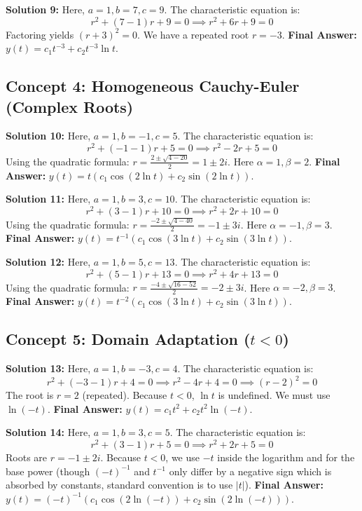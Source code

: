 \documentclass[11pt]{article}
\begin{document}
\textbf{Solution 9:}
Here, $a=1, b=7, c=9$. The characteristic equation is:
\[ r^2 + (7 - 1)r + 9 = 0 \implies r^2 + 6r + 9 = 0 \]
Factoring yields $(r + 3)^2 = 0$. We have a repeated root $r = -3$.
\textbf{Final Answer:} $y(t) = c_1 t^{-3} + c_2 t^{-3} \ln t$.

\subsection*{Concept 4: Homogeneous Cauchy-Euler (Complex Roots)}

\textbf{Solution 10:}
Here, $a=1, b=-1, c=5$. The characteristic equation is:
\[ r^2 + (-1 - 1)r + 5 = 0 \implies r^2 - 2r + 5 = 0 \]
Using the quadratic formula: $r = \frac{2 \pm \sqrt{4 - 20}}{2} = 1 \pm 2i$. Here $\alpha = 1, \beta = 2$.
\textbf{Final Answer:} $y(t) = t(c_1 \cos(2\ln t) + c_2 \sin(2\ln t))$.

\textbf{Solution 11:}
Here, $a=1, b=3, c=10$. The characteristic equation is:
\[ r^2 + (3 - 1)r + 10 = 0 \implies r^2 + 2r + 10 = 0 \]
Using the quadratic formula: $r = \frac{-2 \pm \sqrt{4 - 40}}{2} = -1 \pm 3i$. Here $\alpha = -1, \beta = 3$.
\textbf{Final Answer:} $y(t) = t^{-1}(c_1 \cos(3\ln t) + c_2 \sin(3\ln t))$.

\textbf{Solution 12:}
Here, $a=1, b=5, c=13$. The characteristic equation is:
\[ r^2 + (5 - 1)r + 13 = 0 \implies r^2 + 4r + 13 = 0 \]
Using the quadratic formula: $r = \frac{-4 \pm \sqrt{16 - 52}}{2} = -2 \pm 3i$. Here $\alpha = -2, \beta = 3$.
\textbf{Final Answer:} $y(t) = t^{-2}(c_1 \cos(3\ln t) + c_2 \sin(3\ln t))$.

\subsection*{Concept 5: Domain Adaptation ($t < 0$)}

\textbf{Solution 13:}
Here, $a=1, b=-3, c=4$. The characteristic equation is:
\[ r^2 + (-3 - 1)r + 4 = 0 \implies r^2 - 4r + 4 = 0 \implies (r - 2)^2 = 0 \]
The root is $r = 2$ (repeated). Because $t < 0$, $\ln t$ is undefined. We must use $\ln(-t)$.
\textbf{Final Answer:} $y(t) = c_1 t^2 + c_2 t^2 \ln(-t)$.

\textbf{Solution 14:}
Here, $a=1, b=3, c=5$. The characteristic equation is:
\[ r^2 + (3 - 1)r + 5 = 0 \implies r^2 + 2r + 5 = 0 \]
Roots are $r = -1 \pm 2i$. Because $t < 0$, we use $-t$ inside the logarithm and for the base power (though $(-t)^{-1}$ and $t^{-1}$ only differ by a negative sign which is absorbed by constants, standard convention is to use $|t|$).
\textbf{Final Answer:} $y(t) = (-t)^{-1}(c_1 \cos(2\ln(-t)) + c_2 \sin(2\ln(-t)))$.
\end{document}
